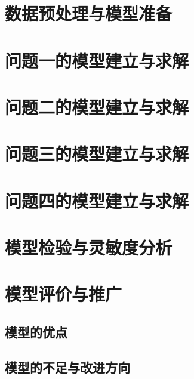 \documentclass[withoutpreface,bwprint]{cumcmthesis}
\begin{document}
\section{数据预处理与模型准备}

\section{问题一的模型建立与求解}

\section{问题二的模型建立与求解}

\section{问题三的模型建立与求解}

\section{问题四的模型建立与求解}

\section{模型检验与灵敏度分析}

\section{模型评价与推广}
\subsection{模型的优点}
\subsection{模型的不足与改进方向}

\end{document}
